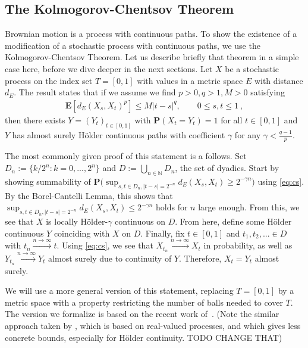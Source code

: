 \documentclass[lean]{Draft}
\begin{document}
\subsection{The Kolmogorov-Chentsov Theorem}
\label{ss:kolchen}

Brownian motion is a process with continuous paths. To show the existence of a modification of a stochastic process with continuous paths, we use the Kolmogorov-Chentsov Theorem.
Let us describe briefly that theorem in a simple case here, before we dive deeper in the next sections.
Let $X$ be a stochastic process on the index set $T = [0,1]$ with values in a metric space $E$ with distance $d_E$.
The result states that if we assume we find $p>0, q>1, M > 0$ satisfying
\begin{align}
\label{eq:cs}
  \mathbf E[d_E(X_s, X_t)^p] \leq M|t-s|^q, \qquad 0\leq s,t\leq 1\:,
\end{align}
then there exists $Y = (Y_t)_{t\in [0,1]}$ with $\mathbf P(X_t = Y_t) = 1$ for all $t\in [0,1]$ and $Y$ has almost surely Hölder continuous paths with coefficient $\gamma$ for any $\gamma < \tfrac {q-1} p$.

The most commonly given proof of this statement is a follows.
Set $D_n := \{k/2^n: k=0,...,2^n\}$ and $D := \bigcup_{n\in\mathbb N} D_n$, the set of dyadics. Start by showing summability of $\mathbf P\Big( \sup_{s,t\in D_n, |t-s| = 2^{-n}} d_E(X_s, X_t) \geq 2^{-\gamma n} \Big)$ using \eqref{eq:cs}.
By the Borel-Cantelli Lemma, this shows that $\sup_{s,t\in D_n, |t-s| = 2^{-n}} d_E(X_s, X_t) \leq 2^{-\gamma n}$ holds for $n$ large enough.
From this, we see that $X$ is locally Hölder-$\gamma$ continuous on $D$.
From here, define some Hölder continuous $Y$ coinciding with $X$ on $D$.
Finally, fix $t \in [0,1]$ and $t_1, t_2,...\in D$ with $t_n \xrightarrow{n\to\infty} t$.
Using \eqref{eq:cs}, we see that $X_{t_n} \xrightarrow{n\to\infty} X_t$ in probability, as well as $Y_{t_n} \xrightarrow{n\to\infty} Y_t$ almost surely due to continuity of $Y$.
Therefore, $X_t = Y_t$ almost surely.

We will use a more general version of this statement, replacing $T = [0,1]$ by a metric space with a property restricting the number of balls needed to cover $T$. The version we formalize is based on
the recent work of~\cite{kratschmer2023kolmogorov}. (Note the similar approach taken by \cite[Chapter~11]{ledoux1991probability}, which is based on real-valued processes, and which gives less concrete bounds, especially for Hölder continuity. TODO CHANGE THAT)
\end{document}
